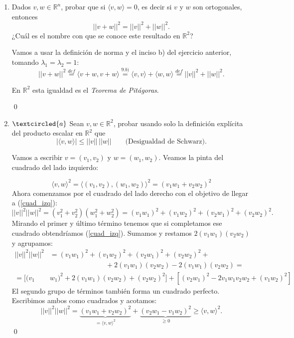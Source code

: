 \begin{enumerate}[topsep=6pt, itemsep=.4cm]
\qed

\item Dados $v, w\in \mathbb R^n$, probar que si  $\langle v , w  \rangle =0$, es decir si $v$ y $w$ son ortogonales,  entonces
    \begin{equation*}
    ||v + w||^2 = ||v||^2 + ||w||^2.
    \end{equation*}
    ¿Cuál es el nombre con que se conoce este resultado en $\mathbb R^2$?
    
\rta Vamos a usar la definición de norma y el inciso b) del ejercicio anterior, tomando $\lambda_1 = \lambda_2 = 1$:
$$||v + w||^2 \overset{def}{=} \langle v+w,v+w \rangle \overset{9.b)}{=} \langle v,v \rangle + \langle w,w \rangle \overset{def}{=} ||v||^2 + ||w||^2.$$


En $\mathbb R^2$ esta igualdad es el \emph{Teorema de Pitágoras}.

\qed
 
\item\label{Schwarz} $\textcircled{a}$ Sean $v,w\in \mathbb R^2$, probar usando  solo la definición explícita del producto escalar en $\mathbb R^2$ que 
\begin{equation*}
    |\langle v , w  \rangle| \le ||v||\,||w|| \qquad \text{(Desigualdad de Schwarz).}
\end{equation*}

\rta Vamos a escribir $v = (v_1 , v_2)$ y $w=(w_1,w_2) $. Veamos la pinta del cuadrado del lado izquierdo:

\begin{equation}\label{cuad_izq}
\langle v,w \rangle^2 = \langle (v_1,v_2) , (w_1,w_2) \rangle^2 =  (v_1 w_1 + v_2 w_2 )^2
\end{equation}
Ahora comenzamos por el cuadrado del lado derecho con el objetivo de llegar a (\ref{cuad_izq}):
\begin{equation*}
||v||^2||w||^2 = (v_1^2 + v_2^2)(w_1^2 + w_2^2) = (v_1 w_1)^2 + (v_1 w_2)^2 + (v_2 w_1)^2 + (v_2 w_2)^2.
\end{equation*}
Mirando el primer y último término tenemos que si completamos ese cuadrado obtendríamos (\ref{cuad_izq}). Sumamos y restamos $2(v_1w_1)(v_2w_2)$ y agrupamos:
\begin{align*}
    ||v||^2||w||^2 &= (v_1 w_1)^2 + (v_1 w_2)^2 + (v_2 w_1)^2 + (v_2 w_2)^2+ \\
                & \qquad\qquad\qquad\qquad+ 2(v_1w_1)(v_2w_2) - 2(v_1w_1)(v_2w_2) = \\
                = [(v_1 &w_1)^2 + 2(v_1w_1)(v_2w_2) + (v_2 w_2)^2 ] + [(v_2 w_1)^2 - 2v_1w_1v_2w_2 + (v_1 w_2)^2 ]
\end{align*}
El segundo grupo de términos también forma un cuadrado perfecto. Escribimos ambos como cuadrados y acotamos:
\begin{equation*}
    ||v||^2||w||^2 = \underset{= \langle v,w \rangle^2}{ \underbrace{ (v_1w_1 + v_2w_2)^2} } + \underset{\geq 0}{ \underbrace{ (v_2w_1 - v_1w_2)^2}} \geq \langle v,w \rangle^2.
\end{equation*}
  \qed

\end{enumerate}


